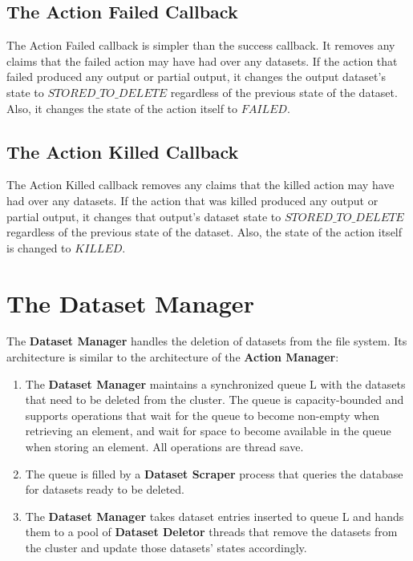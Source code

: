 \subsection{The Action Failed Callback}
The Action Failed callback is simpler than the success callback. It removes any claims that the failed action may have had over any datasets. If the action that failed produced any output or partial output, it changes the output dataset's state to $STORED\_TO\_DELETE$ regardless of the previous state of the dataset. Also, it changes the state of the action itself to $FAILED$.

\subsection{The Action Killed Callback}
The Action Killed callback removes any claims that the killed action may have had over any datasets. If the action that was killed produced any output or partial output, it changes that output's dataset state to $STORED\_TO\_DELETE$ regardless of the previous state of the dataset. Also, the state of the action itself is changed to $KILLED$.

\section{The Dataset Manager}
The \textbf{Dataset Manager} handles the deletion of datasets from the file system. Its architecture is similar to the architecture of the \textbf{Action Manager}:

\begin{enumerate}
\item The \textbf{Dataset Manager} maintains a synchronized queue L with the datasets that need to be deleted from the cluster. The queue is capacity-bounded and supports operations that wait for the queue to become non-empty when retrieving an element, and wait for space to become available in the queue when storing an element. All operations are thread save.
\item The queue is filled by a \textbf{Dataset Scraper} process that queries the database for datasets ready to be deleted.
\item The \textbf{Dataset Manager} takes dataset entries inserted to queue L and hands them to a pool of \textbf{Dataset Deletor} threads that remove the datasets from the cluster and update those datasets' states accordingly.
\end{enumerate}

